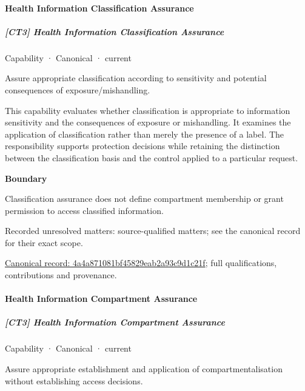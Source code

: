 \paragraph{Health Information Classification Assurance}

\subparagraph{[CT3] Health Information Classification Assurance}

\label{element:4a4a871081bf45829eab2a93c9d1c21f}
{\small Capability · Canonical · current}\par

Assure appropriate classification according to sensitivity and potential consequences of exposure/mishandling.



This capability evaluates whether classification is appropriate to information sensitivity and the consequences of exposure or mishandling. It examines the application of classification rather than merely the presence of a label. The responsibility supports protection decisions while retaining the distinction between the classification basis and the control applied to a particular request.



\textbf{Boundary}



Classification assurance does not define compartment membership or grant permission to access classified information.


{\small Recorded unresolved matters: source-qualified matters; see the canonical record for their exact scope.}\par
{\footnotesize \href{../../../../continuum/strategy/capability/4a4a871081bf45829eab2a93c9d1c21f.md}{Canonical record: 4a4a871081bf45829eab2a93c9d1c21f}; full qualifications, contributions and provenance.}\par
\paragraph{Health Information Compartment Assurance}

\subparagraph{[CT3] Health Information Compartment Assurance}

\label{element:be47d201de1a45a88f48234d69deb2eb}
{\small Capability · Canonical · current}\par

Assure appropriate establishment and application of compartmentalisation without establishing access decisions.



